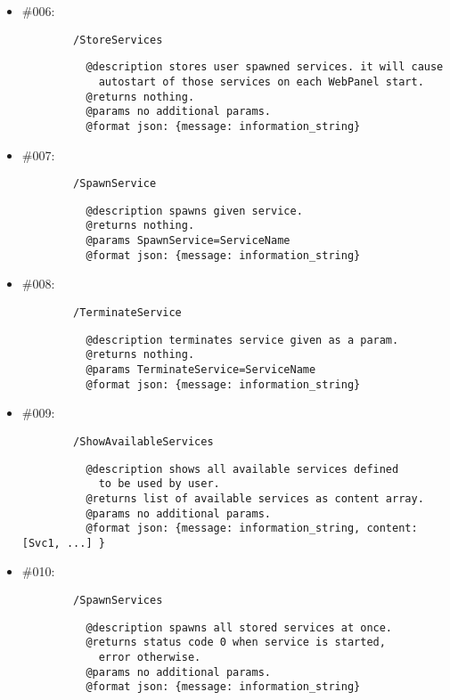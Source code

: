 \documentclass[11pt,a4paper]{scrartcl}
\begin{document}
\begin{description}
\begin{itemize}
        \item \#006:
          \begin{verbatim}
        /StoreServices
          \end{verbatim}
          \begin{verbatim}
          @description stores user spawned services. it will cause
            autostart of those services on each WebPanel start.
          @returns nothing.
          @params no additional params.
          @format json: {message: information_string}
          \end{verbatim}

        \item \#007:
          \begin{verbatim}
        /SpawnService
          \end{verbatim}
          \begin{verbatim}
          @description spawns given service.
          @returns nothing.
          @params SpawnService=ServiceName
          @format json: {message: information_string}
          \end{verbatim}

        \item \#008:
          \begin{verbatim}
        /TerminateService
          \end{verbatim}
          \begin{verbatim}
          @description terminates service given as a param.
          @returns nothing.
          @params TerminateService=ServiceName
          @format json: {message: information_string}
          \end{verbatim}

        \item \#009:
          \begin{verbatim}
        /ShowAvailableServices
          \end{verbatim}
          \begin{verbatim}
          @description shows all available services defined
            to be used by user.
          @returns list of available services as content array.
          @params no additional params.
          @format json: {message: information_string, content:[Svc1, ...] }
          \end{verbatim}

        \item \#010:
          \begin{verbatim}
        /SpawnServices
          \end{verbatim}
          \begin{verbatim}
          @description spawns all stored services at once.
          @returns status code 0 when service is started,
            error otherwise.
          @params no additional params.
          @format json: {message: information_string}
          \end{verbatim}


\end{itemize}
\end{description}
\end{document}
